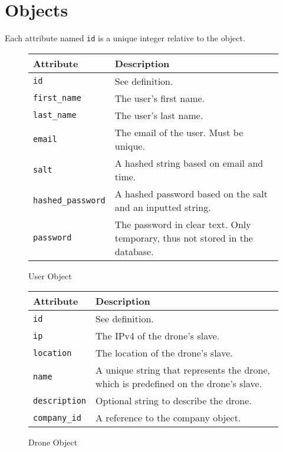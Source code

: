 \chapter{Objects}
\label{app:objects}

Each attribute named \verb+id+ is a unique integer relative to the object.

\begin{figure}[htb]
\begin{center}
\begin{tabular}{ | l | p{8cm} | }
  \hline
    \textbf{Attribute} & \textbf{Description} \\ \hline
    \verb+id+ & See definition.\\ \hline
    \verb+first_name+ & The user's first name.\\ \hline
    \verb+last_name+ & The user's last name.\\ \hline
    \verb+email+ & The email of the user. Must be unique.\\ \hline
    \verb+salt+ & A hashed string based on email and time.\\ \hline
    \verb+hashed_password+ & A hashed password based on the salt and an inputted string.\\ \hline
    \verb+password+ & The password in clear text. Only temporary, thus not stored in the database.\\ \hline
\end{tabular}
\caption{User Object}
\label{tab:user_object}
\end{center}
\end{figure}

\begin{figure}[htb]
\begin{center}
\begin{tabular}{ | l | p{8cm} | }
  \hline
    \textbf{Attribute} & \textbf{Description} \\ \hline
    \verb+id+ & See definition.\\ \hline
    \verb+ip+ & The IPv4 of the drone's slave.\\ \hline
    \verb+location+ & The location of the drone's slave.\\ \hline
    \verb+name+ & A unique string that represents the drone, which is predefined on the drone's slave.\\ \hline
    \verb+description+ & Optional string to describe the drone.\\ \hline
    \verb+company_id+ & A reference to the company object.\\ \hline
\end{tabular}
\caption{Drone Object}
\label{tab:drone_object}
\end{center}
\end{figure}

